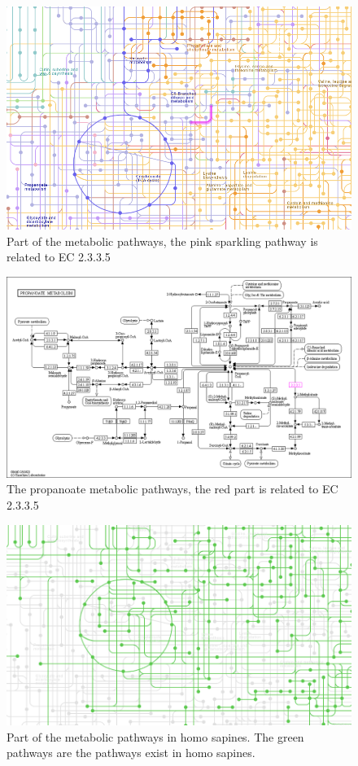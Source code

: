 \documentclass[a4paper,english,12pt,bibliography=totoc]{scrreprt}
\begin{document}
\begin{figure}[H]
    \centering
    \includegraphics[width=0.9\linewidth]{Project 2/Kegg pathways/metabolic pathways.png}
    \caption{Part of the metabolic pathways, the pink sparkling pathway is related to EC 2.3.3.5}
\end{figure}

\begin{figure}[H]
    \centering
    \includegraphics[width=0.9\linewidth]{Project 2/Kegg pathways/Propanoate metabolism.png}
    \caption{The propanoate metabolic pathways, the red part is related to EC 2.3.3.5}
\end{figure}

\begin{figure}[H]
    \centering
    \includegraphics[width=0.9\linewidth]{Project 2/Kegg pathways/metabolic pathways hs.png}
    \caption{Part of the metabolic pathways in homo sapines. The green pathways are the pathways exist in homo sapines.}
\end{figure}
\end{document}

